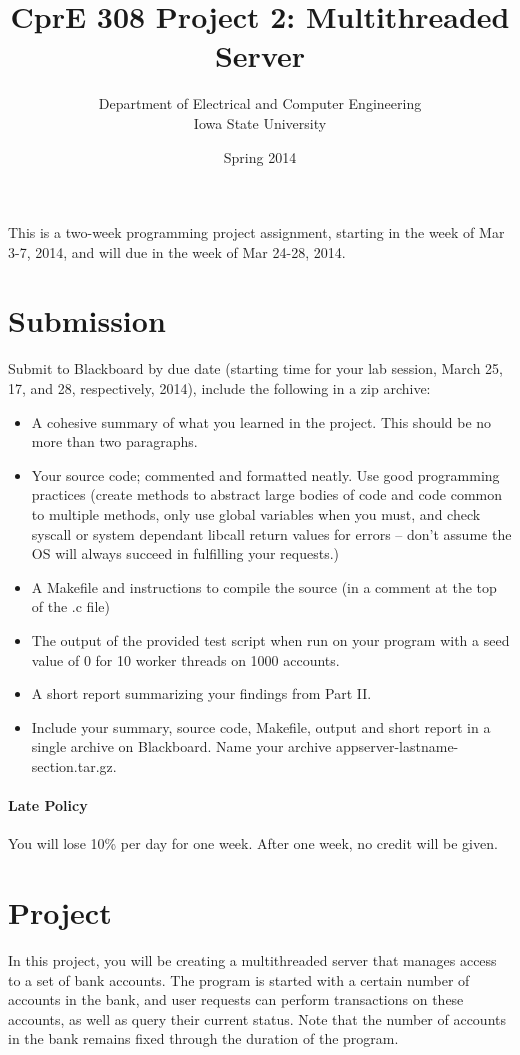 \documentclass[letterpaper,10pt]{article}
\title{CprE 308 Project 2: Multithreaded Server}
\author{Department of Electrical and Computer Engineering \\ Iowa State University}
\date{Spring 2014}
\begin{document}
\maketitle

This is a two-week programming project assignment, starting in the week of Mar 3-7, 2014,
and will due in the week of Mar 24-28, 2014.

\section{Submission}

Submit to Blackboard by due date (starting time for your lab session, March 25, 17, and 28,
respectively, 2014), include the following in a zip archive:

\begin{itemize}
 \item A cohesive summary of what you learned in the project. This should be no more than two paragraphs.
 \item Your source code; commented and formatted neatly. Use good programming practices
  (create methods to abstract large bodies of code and code common to multiple methods, only use global
  variables when you must, and check syscall or system dependant libcall return values for errors -- don't assume
  the OS will always succeed in fulfilling your requests.)
 \item A Makefile and instructions to compile the source (in a comment at the top of the .c file)
 \item The output of the provided test script when run on your program with a seed value of 0 for 10
 worker threads on 1000 accounts.
 \item A short report summarizing your findings from Part II.
 \item Include your summary, source code, Makefile, output and short report in a single archive on Blackboard.
 Name your archive appserver-lastname-section.tar.gz.
\end{itemize}

\paragraph{Late Policy}
You will lose 10\% per day for one week. After one week, no credit will be given.

\section{Project}
In this project, you will be creating a multithreaded server that manages access to a set of bank accounts.
The program is started with a certain number of accounts in the bank, and user requests can perform
transactions on these accounts, as well as query their current status. Note that the number of accounts
in the bank remains fixed through the duration of the program.
\end{document}
